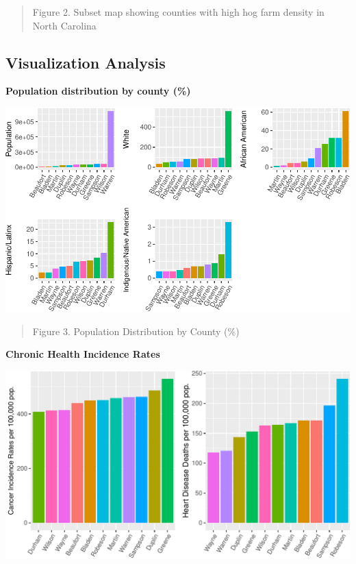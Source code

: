 \documentclass[
  12pt,
]{article}
\begin{document}
\begin{quote}
Figure 2. Subset map showing counties with high hog farm density in
North Carolina
\end{quote}

\newpage

\hypertarget{visualization-analysis}{%
\subsection{Visualization Analysis}\label{visualization-analysis}}

\textbf{Population distribution by county (\%)}

\includegraphics{JacobChan_FinalProject_HogFarms_files/figure-latex/pop final-1.pdf}

\begin{quote}
Figure 3. Population Distribution by County (\%)
\end{quote}

\newpage

\textbf{Chronic Health Incidence Rates}

\includegraphics{JacobChan_FinalProject_HogFarms_files/figure-latex/disease final-1.pdf}
\end{document}
